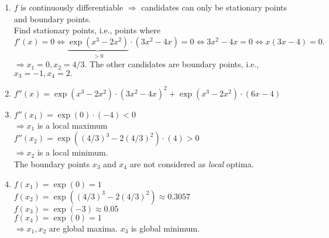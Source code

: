 \documentclass[a4paper]{article}
\makeatletter
\newcommand{\hlnum}[1]{\textcolor[rgb]{0.686,0.059,0.569}{#1}}%
\newcommand{\hlstr}[1]{\textcolor[rgb]{0.192,0.494,0.8}{#1}}%
\newcommand{\hlopt}[1]{\textcolor[rgb]{0,0,0}{#1}}%
\newcommand{\hlstd}[1]{\textcolor[rgb]{0.345,0.345,0.345}{#1}}%
\newcommand{\hlkwc}[1]{\textcolor[rgb]{0.333,0.667,0.333}{#1}}%
\newcommand{\hlkwd}[1]{\textcolor[rgb]{0.737,0.353,0.396}{\textbf{#1}}}%
\newenvironment{kframe}{%
 \def\at@end@of@kframe{}%
 \ifinner\ifhmode%
  \def\at@end@of@kframe{\end{minipage}}%
  \begin{minipage}{\columnwidth}%
 \fi\fi%
 \def\FrameCommand##1{\hskip\@totalleftmargin \hskip-\fboxsep
 \colorbox{shadecolor}{##1}\hskip-\fboxsep
     \hskip-\linewidth \hskip-\@totalleftmargin \hskip\columnwidth}%
 \MakeFramed {\advance\hsize-\width
   \@totalleftmargin\z@ \linewidth\hsize
   \@setminipage}}%
 {\par\unskip\endMakeFramed%
 \at@end@of@kframe}
\newenvironment{knitrout}{}{} %
\makeatother
\begin{document}
{\begin{enumerate}
\begin{knitrout}
\begin{kframe}
\begin{alltt}
\hlkwd{ggplot}\hlstd{(}\hlkwd{data.frame}\hlstd{(}\hlkwc{x} \hlstd{=} \hlkwd{seq}\hlstd{(}\hlopt{-}\hlnum{1}\hlstd{,} \hlnum{2}\hlstd{,} \hlkwc{by}\hlstd{=}\hlnum{0.005}\hlstd{)),} \hlkwd{aes}\hlstd{(x))} \hlopt{+}
  \hlkwd{geom_function}\hlstd{(}\hlkwc{fun} \hlstd{= f,} \hlkwd{aes}\hlstd{(}\hlkwc{linetype} \hlstd{=} \hlstr{"f"}\hlstd{))} \hlopt{+}
  \hlkwd{geom_function}\hlstd{(}\hlkwc{fun} \hlstd{= df,} \hlkwd{aes}\hlstd{(}\hlkwc{linetype} \hlstd{=} \hlstr{"f'"}\hlstd{))}    \hlopt{+}
  \hlkwd{scale_linetype_discrete}\hlstd{(}\hlkwc{name} \hlstd{=} \hlstr{"Function"}\hlstd{)}
\end{alltt}
\end{kframe}
\texttt{[image: figure/1d-plot-1]} 
\end{knitrout}
	\item $f$ is continuously differentiable $\Rightarrow$ candidates can only be stationary points and boundary points. \\
	Find stationary points, i.e., points where \\ 
	$f'(x) = 0 \iff  \underbrace{\exp(x^3 - 2x^2)}_{>0}\cdot(3x^2 - 4x) = 0 \iff 3x^2 - 4x = 0 \iff x(3x - 4) = 0 .$ \\
	$\Rightarrow x_1 = 0, x_2 = 4/3.$
	The other candidates are boundary points, i.e., $x_3 = -1, x_4 = 2.$
	\item $f''(x) = \exp(x^3 - 2x^2)\cdot(3x^2 - 4x)^2 + \exp(x^3 - 2x^2)\cdot(6x - 4)$ \\
	\item $f''(x_1) = \exp(0)\cdot(- 4) < 0$ \\
	  $\Rightarrow x_1$ is a local maximum \\[\baselineskip]
	  $f''(x_2) = \exp((4/3)^3 - 2(4/3)^2)\cdot(4) > 0$ \\
	  $\Rightarrow x_2$ is a local minimum. \\[\baselineskip]
	  The boundary points $x_3$ and $x_4$ are not considered as \textit{local} optima.
	\item $f(x_1) = \exp(0) = 1$ \\
	 $f(x_2) = \exp((4/3)^3 - 2(4/3)^2) \approx 0.3057$ \\
	  $f(x_3) = \exp(-3) \approx 0.05$ \\
	  $f(x_4) = \exp(0) = 1$ \\
	  $\Rightarrow x_1, x_2$ are global maxima.
	  $x_3$ is global minimum.
	
\end{enumerate}
}
\end{document}

